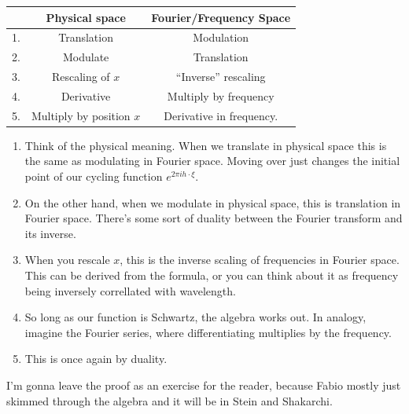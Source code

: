 \begin{remark}

	\begin{tabular}{|c|c|c|}
		& Physical space & Fourier/Frequency Space \\ \hline
		1. & Translation & Modulation \\
		2. & Modulate & Translation \\
		3. & Rescaling of \( x \) & ``Inverse'' rescaling \\
		4. & Derivative & Multiply by frequency \\
		5. & Multiply by position \( x \) & Derivative in frequency.

		
	\end{tabular}
	\begin{enumerate}
	
		\item Think of the physical meaning. When we translate in physical space this is the same as modulating in Fourier space. Moving over just changes the initial point of our cycling function \( e^{2 \pi i h \cdot \xi} \).
		\item On the other hand, when we modulate in physical space, this is translation in Fourier space. There's some sort of duality between the Fourier transform and its inverse.
		\item When you rescale \( x \), this is the inverse scaling of frequencies in Fourier space. This can be derived from the formula, or you can think about it as frequency being inversely correllated with wavelength.
		\item So long as our function is Schwartz, the algebra works out. In analogy, imagine the Fourier series, where differentiating multiplies by the frequency.
		\item This is once again by duality.
	
	\end{enumerate}
	I'm gonna leave the proof as an exercise for the reader, because Fabio mostly just skimmed through the algebra and it will be in Stein and Shakarchi.
\end{remark}


